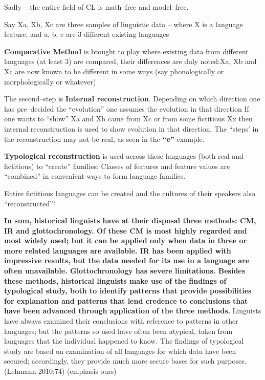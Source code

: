 Sadly – the entire field of CL is math–free and model–free.

Say Xa, Xb, Xc are three samples of linguistic data – where X is a language feature, and a, b, c are 3 different existing languages

\newpage

\textbf{Comparative Method} is brought to play where existing data from different languages (at least 3) are compared, their differences are duly noted:Xa, Xb and Xc are now known to be different in some ways (say phonologically or morphologically or whatever)

The second–step is \textbf{Internal reconstruction}. Depending on which direction one has pre–decided the “evolution” one assumes the evolution in that direction If one wants to “show” Xa and Xb came from Xc or from some fictitious Xx then internal reconstruction is used to show evolution in that direction. The “steps’ in the reconstruction may not be real, as seen in the \textbf{“e”} example.

\textbf{Typological reconstruction} is used across these languages (both real and fictitious) to “create” families: Classes of features and feature values are “combined” in convenient ways to form language families.

Entire fictitious languages can be created and the cultures of their speakers also “reconstructed”!

\begin{myquote}
\textbf{In sum, historical linguists have at their disposal three methods: CM, IR and glottochronology. Of these CM is most highly regarded and most widely used; but it can be applied only when data in three or more related languages are available. IR has been applied with impressive results, but the data needed for its use in a language are often unavailable. Glottochronology has severe limitations. Besides these methods, historical linguists make use of the findings of typological study, both to identify patterns that provide possibilities for explanation and patterns that lend credence to conclusions that have been advanced through application of the three methods.} Linguists have always examined their conclusions with reference to patterns in other languages; but the patterns so used have often been atypical, taken from languages that the individual happened to know. The findings of typological study are based on examination of all languages for which data have been secured; accordingly, they provide much more secure bases for such purposes. (Lehmann 2010:74) (emphasis ours)
\end{myquote}


